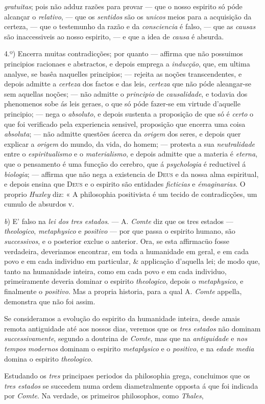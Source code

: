 \emph{gratuitas}; pois não adduz razões para provar --- que o nosso espirito só póde alcançar o \emph{relativo}, --- que os \emph{sentidos} são os \emph{unicos} meios para a acquisição da certeza, --- que o testemunho da razão e da \emph{consciencia} é falso, --- que as \emph{causas} são inaccessiveis ao nosso espirito, --- e que a idea de \emph{causa} é absurda.\par 4.º) Encerra muitas contradicções; por quanto --- affirma que não possuimos principios racionaes e abstractos, e depois emprega a \emph{inducção}, que, em ultima analyse, se basêa naquelles principios; --- rejeita as noções transcendentes, e depois admitte a \emph{certeza} dos factos e das leis, \emph{certeza} que não póde aleangar-se sem aquellas noções; --- não admitte o \emph{principio} de \emph{causalidade}, e todavia dos phenomenos sobe ás leis geraes, o que só póde fazer-se em virtude d'aquelle principio; --- nega o \emph{absoluto}, e depois sustenta a proposição de que só é \emph{certo} o que foi verificado pela experiencia sensivel, proposição que encerra uma coisa \emph{absoluta}; --- não admitte questões ácerca da \emph{origem} dos seres, e depois quer explicar a \emph{origem} do mundo, da vida, do homem; --- protesta a sua \emph{neutralidade} entre o \emph{espiritualismo} e o \emph{materialismo}, e depois admitte que a materia é \emph{eterna}, que o pensamento é uma funcção do cerebro, que á \emph{psychologia} é reductivel á \emph{biologia}; --- affirma que não nega a existencia de \textsc{Deus} e da nossa alma espiritual, e depois ensina que \textsc{Deus} e o espirito são entidades \emph{ficticias} e \emph{émaginarias}. O proprio \emph{Huxley} diz: « A philosophia positivista é um tecido de contradicções, um cumulo de absurdos v.\par \emph{b}) E' falso na \emph{lei dos tres estados}. --- A. \emph{Comte} diz que os tres estados --- \emph{theologico}, \emph{metaphysico} e \emph{positivo} --- por que passa o espirito humano, são \emph{successivos}, e o posterior exclue o anterior. Ora, se esta affirmacüo fosse verdadeira, deveriamos encontrar, em toda a humanidade em geral, e em cada povo e em cada individuo em particular, \& applicação d'aquella lei; de modo que, tanto na humanidade inteira, como em cada povo e em cada individuo, primeiramente deveria dominar o espirito \emph{theologico}, depois o \emph{metaphysico}, e finalmente o \emph{positivo}. Mas a propria historia, para a qual A. \emph{Comte} appella, demonstra que não foi assim.\par Se consideramos a evolução do espirito da humanidade inteira, desde amais remota antiguidade até aos nossos dias, veremos que os \emph{tres estados} não dominam \emph{successivamente}, segundo a doutrina de \emph{Comte}, mas que na \emph{antiguidade} e \emph{nos tempos modernos} dominam o espirito \emph{metaplysico} e o \emph{positivo}, e na \emph{edade media} domina o espirito \emph{theologico}.\par Estudando os \emph{tres} principaes periodos da philosophia grega, concluimos que os \emph{tres estados} se succedem numa ordem diametralmente opposta á que foi indicada por \emph{Comte}. Na verdade, os primeiros philosophos, como \emph{Thales}, 